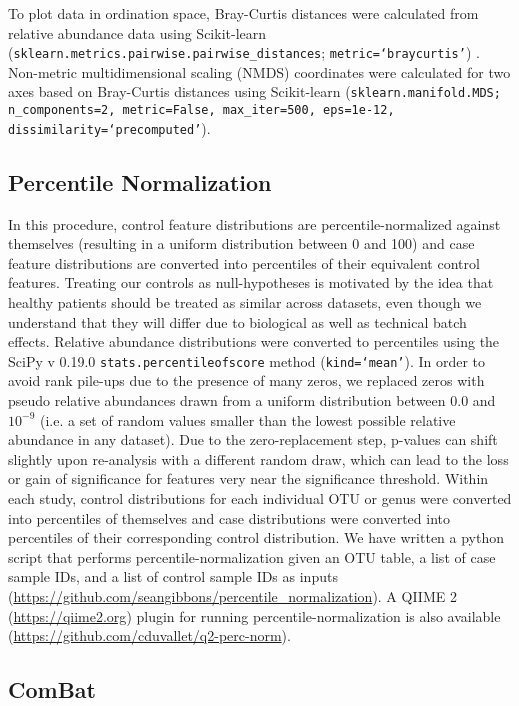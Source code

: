 To plot data in ordination space, Bray-Curtis distances were calculated from relative abundance data using Scikit-learn (\texttt{sklearn.metrics.pairwise.pairwise\_distances}; \texttt{metric=`braycurtis'}) \cite{39}.
Non-metric multidimensional scaling (NMDS) coordinates were calculated for two axes based on Bray-Curtis distances using Scikit-learn (\texttt{sklearn.manifold.MDS; n\_components=2, metric=False, max\_iter=500, eps=1e-12, dissimilarity=`precomputed'}).

\subsection{Percentile Normalization}

In this procedure, control feature distributions are percentile-normalized against themselves (resulting in a uniform distribution between 0 and 100) and case feature distributions are converted into percentiles of their equivalent control features.
Treating our controls as null-hypotheses is motivated by the idea that healthy patients should be treated as similar across datasets, even though we understand that they will differ due to biological as well as technical batch effects.
Relative abundance distributions were converted to percentiles using the SciPy v 0.19.0 \cite{40} \texttt{stats.percentileofscore} method (\texttt{kind=`mean'}).
In order to avoid rank pile-ups due to the presence of many zeros, we replaced zeros with pseudo relative abundances drawn from a uniform distribution between 0.0 and $10^{-9}$ (i.e. a set of random values smaller than the lowest possible relative abundance in any dataset).
Due to the zero-replacement step, p-values can shift slightly upon re-analysis with a different random draw, which can lead to the loss or gain of significance for features very near the significance threshold.
Within each study, control distributions for each individual OTU or genus were converted into percentiles of themselves and case distributions were converted into percentiles of their corresponding control distribution.
We have written a python script that performs percentile-normalization given an OTU table, a list of case sample IDs, and a list of control sample IDs as inputs (\url{https://github.com/seangibbons/percentile_normalization}).
A QIIME 2 (\url{https://qiime2.org}) plugin for running percentile-normalization is also available (\url{https://github.com/cduvallet/q2-perc-norm}).

\subsection{ComBat}

